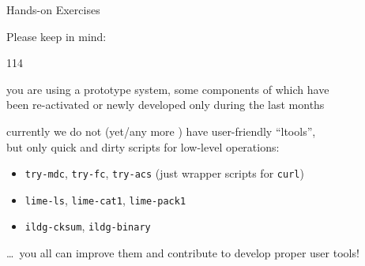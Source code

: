 \documentclass[aspectratio=169,xcolor=dvipsnames]{beamer}
\newcommand{\bi}{\begin{itemize}}
\newcommand{\ei}{\end{itemize}}
\begin{document}
\begin{frame}{Hands-on Exercises}

  Please keep in mind:
  
  \begin{dinglist}{114}

  \item you are using a prototype system, some components of which have\\
    been re-activated or newly developed only during the last months
    
  \item currently we do not (yet/any more ) have user-friendly ``ltools'',\\
    but only quick and dirty scripts for low-level operations:
    \bi
    \item {\tt try-mdc}, {\tt try-fc}, {\tt try-acs} (just wrapper scripts for {\tt curl})
    \item {\tt lime-ls}, {\tt lime-cat1}, {\tt lime-pack1}
    \item {\tt ildg-cksum}, {\tt ildg-binary}
    \ei

    \ldots\ you all can improve them and contribute to develop proper user tools!
  \end{dinglist}

  \vfill
\end{frame}
\end{document}
